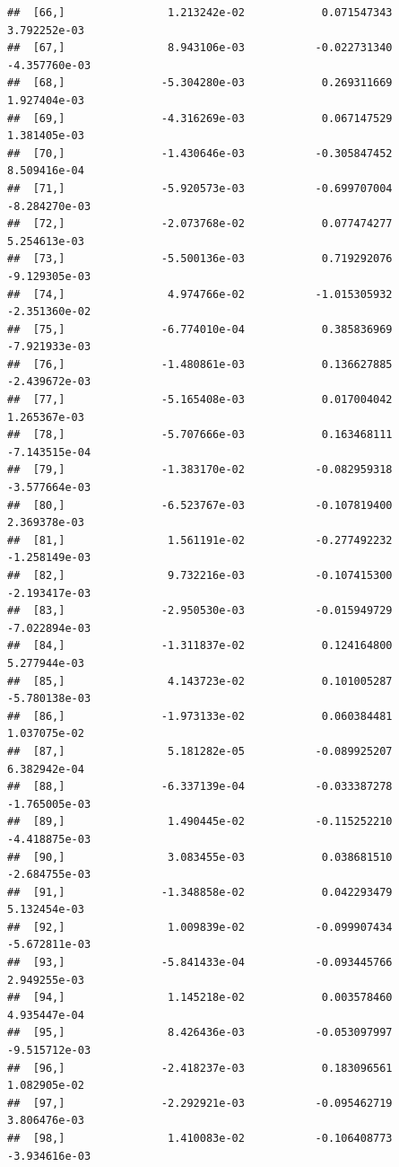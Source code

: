 \documentclass[11pt,preprint, authoryear]{elsarticle}
\numberwithin{equation}{section}
\numberwithin{figure}{section}
\numberwithin{table}{section}
\begin{document}
\begin{verbatim}
##  [66,]                1.213242e-02            0.071547343      3.792252e-03
##  [67,]                8.943106e-03           -0.022731340     -4.357760e-03
##  [68,]               -5.304280e-03            0.269311669      1.927404e-03
##  [69,]               -4.316269e-03            0.067147529      1.381405e-03
##  [70,]               -1.430646e-03           -0.305847452      8.509416e-04
##  [71,]               -5.920573e-03           -0.699707004     -8.284270e-03
##  [72,]               -2.073768e-02            0.077474277      5.254613e-03
##  [73,]               -5.500136e-03            0.719292076     -9.129305e-03
##  [74,]                4.974766e-02           -1.015305932     -2.351360e-02
##  [75,]               -6.774010e-04            0.385836969     -7.921933e-03
##  [76,]               -1.480861e-03            0.136627885     -2.439672e-03
##  [77,]               -5.165408e-03            0.017004042      1.265367e-03
##  [78,]               -5.707666e-03            0.163468111     -7.143515e-04
##  [79,]               -1.383170e-02           -0.082959318     -3.577664e-03
##  [80,]               -6.523767e-03           -0.107819400      2.369378e-03
##  [81,]                1.561191e-02           -0.277492232     -1.258149e-03
##  [82,]                9.732216e-03           -0.107415300     -2.193417e-03
##  [83,]               -2.950530e-03           -0.015949729     -7.022894e-03
##  [84,]               -1.311837e-02            0.124164800      5.277944e-03
##  [85,]                4.143723e-02            0.101005287     -5.780138e-03
##  [86,]               -1.973133e-02            0.060384481      1.037075e-02
##  [87,]                5.181282e-05           -0.089925207      6.382942e-04
##  [88,]               -6.337139e-04           -0.033387278     -1.765005e-03
##  [89,]                1.490445e-02           -0.115252210     -4.418875e-03
##  [90,]                3.083455e-03            0.038681510     -2.684755e-03
##  [91,]               -1.348858e-02            0.042293479      5.132454e-03
##  [92,]                1.009839e-02           -0.099907434     -5.672811e-03
##  [93,]               -5.841433e-04           -0.093445766      2.949255e-03
##  [94,]                1.145218e-02            0.003578460      4.935447e-04
##  [95,]                8.426436e-03           -0.053097997     -9.515712e-03
##  [96,]               -2.418237e-03            0.183096561      1.082905e-02
##  [97,]               -2.292921e-03           -0.095462719      3.806476e-03
##  [98,]                1.410083e-02           -0.106408773     -3.934616e-03

\end{verbatim}
\end{document}
